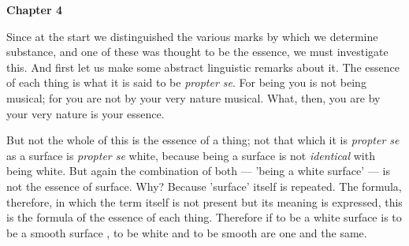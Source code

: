 \textbf{Chapter 4}

Since at the start we distinguished the various marks by which we determine substance, and one of these was thought to be the essence, we must investigate this. And first let us make some abstract linguistic remarks about it. The essence of each thing is what it is said to be \emph{propter se}. For being you is not being musical; for you are not by your very nature musical. What, then, you are by your very nature is your essence.

But not the whole of this is the essence of a thing; not
that which it is \emph{propter se} as a surface is \emph{propter se} white, because being a surface is not \emph{identical} with being white. But again the combination of both — 'being a white surface' — is not the essence of surface. Why? Because 'surface' itself is repeated. The formula, therefore, in which the term itself is not present but its meaning is expressed, this is the formula of the essence of each thing. Therefore if to be a white surface is to be a smooth surface , to be white and to be smooth are one and the same.

